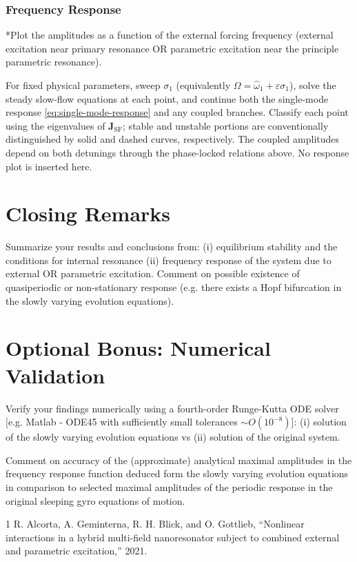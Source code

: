 \documentclass[11pt]{article}
\newenvironment{assignmentinstruction}{\par\begingroup\color{blue}}{\par\endgroup}
\begin{document}
\subsubsection{Frequency Response}
\begin{assignmentinstruction}
*Plot the amplitudes as a function of the external forcing frequency (external excitation near primary resonance OR parametric excitation near the principle parametric resonance).
\end{assignmentinstruction}
For fixed physical parameters, sweep $\sigma_1$ (equivalently $\Omega=\hat{\omega}_1+\varepsilon\sigma_1$), solve the steady slow-flow equations at each point, and continue both the single-mode response \eqref{eq:single-mode-response} and any coupled branches. Classify each point using the eigenvalues of $\mathbf{J}_{\mathrm{SF}}$; stable and unstable portions are conventionally distinguished by solid and dashed curves, respectively. The coupled amplitudes depend on both detunings through the phase-locked relations above. No response plot is inserted here.

\section{Closing Remarks}
\begin{assignmentinstruction}
Summarize your results and conclusions from: (i) equilibrium stability and the conditions for internal resonance (ii) frequency response of the system due to external OR parametric excitation. Comment on possible existence of quasiperiodic or non-stationary response (e.g. there exists a Hopf bifurcation in the slowly varying evolution equations).
\end{assignmentinstruction}

\section{Optional Bonus: Numerical Validation}
\begin{assignmentinstruction}
Verify your findings numerically using a fourth-order Runge-Kutta ODE solver [e.g. Matlab - ODE45 with sufficiently small tolerances $\sim O(10^{-8})$]: (i) solution of the slowly varying evolution equations vs (ii) solution of the original system.

Comment on accuracy of the (approximate) analytical maximal amplitudes in the frequency response function deduced form the slowly varying evolution equations in comparison to selected maximal amplitudes of the periodic response in the original sleeping gyro equations of motion.
\end{assignmentinstruction}

\begin{thebibliography}{1}
R. Alcorta, A. Geminterna, R. H. Blick, and O. Gottlieb,
``Nonlinear interactions in a hybrid multi-field nanoresonator subject to combined external and parametric excitation,'' 2021.
\end{thebibliography}
\end{document}
